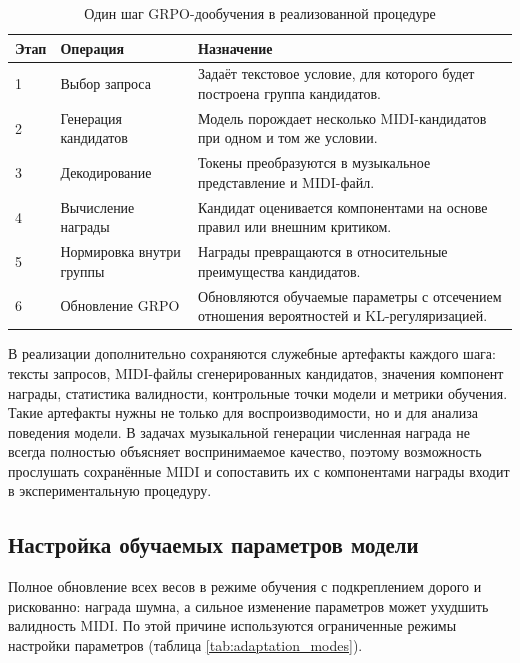 \documentclass[a4paper,12pt]{extarticle}
\begin{document}
\begin{table}[ht]
\centering
\caption{Один шаг GRPO-дообучения в реализованной процедуре}
\label{tab:grpo_training_step}
\begin{tabular}{|p{}|p{}|p{}|}
\hline
\textbf{Этап} & \textbf{Операция} & \textbf{Назначение} \\
\hline
1 & Выбор запроса & Задаёт текстовое условие, для которого будет построена группа кандидатов. \\
\hline
2 & Генерация кандидатов & Модель порождает несколько MIDI-кандидатов при одном и том же условии. \\
\hline
3 & Декодирование & Токены преобразуются в музыкальное представление и MIDI-файл. \\
\hline
4 & Вычисление награды & Кандидат оценивается компонентами на основе правил или внешним критиком. \\
\hline
5 & Нормировка внутри группы & Награды превращаются в относительные преимущества кандидатов. \\
\hline
6 & Обновление GRPO & Обновляются обучаемые параметры с отсечением отношения вероятностей и KL-регуляризацией. \\
\hline
\end{tabular}
\end{table}

В реализации дополнительно сохраняются служебные артефакты каждого шага:
тексты запросов, MIDI-файлы сгенерированных кандидатов, значения
компонент награды, статистика валидности, контрольные точки модели и метрики обучения.
Такие артефакты нужны не только для воспроизводимости, но и для анализа
поведения модели. В задачах музыкальной генерации численная награда не всегда
полностью объясняет воспринимаемое качество, поэтому возможность
прослушать сохранённые MIDI и сопоставить их с компонентами награды
входит в экспериментальную процедуру.

\subsection{Настройка обучаемых параметров модели}

Полное обновление всех весов в режиме обучения с подкреплением дорого и
рискованно: награда шумна, а сильное изменение параметров может ухудшить
валидность MIDI. По этой причине используются ограниченные режимы настройки параметров
(таблица \ref{tab:adaptation_modes}).
\end{document}
